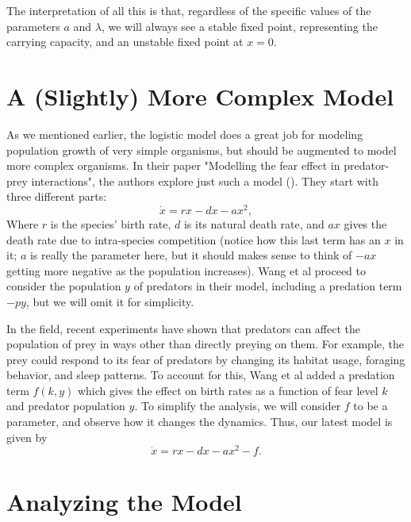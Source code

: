 \documentclass[man, 12pt]{apa6}
\newcommand{\citep}[1]{(\cite{#1})}
\begin{document}
The interpretation of all this is that, regardless of the specific values of the parameters $a$ and $\lambda$, we will always see a stable fixed point, representing the carrying capacity, and an unstable fixed point at $x=0$. 

\section{A (Slightly) More Complex Model}


As we mentioned earlier, the logistic model does a great job for modeling population growth of very simple organisms, but should be augmented to model more complex organisms. In their paper "Modelling the fear effect in predator-prey
interactions", the authors explore just such a model \citep{wang_2016}. They start with three different parts:
$$\dot{x}=rx-dx-ax^2,$$
Where $r$ is the species' birth rate, $d$ is its
natural death rate, and $ax$ gives the death rate due to intra-species competition (notice how this last term has an $x$ in it; $a$ is really the parameter here, but it should makes sense to think of $-ax$ getting more negative as the population increases). Wang et al proceed to consider the population $y$ of predators in their model, including a predation term $-py$, but we will omit it for simplicity.

In the field, recent experiments have shown that predators can affect the population of prey in ways other than directly preying on them. For example, the prey could respond to its fear of predators by changing its habitat usage, foraging behavior, and sleep patterns. %
To account for this, Wang et al added a predation term $f(k,y)$ which gives the effect on birth rates as a function of fear level $k$ and predator population $y$. To simplify the analysis, we will consider $f$ to be a parameter, and observe how it changes the dynamics. Thus, our latest model is given by 
$$\dot{x}=rx-dx-ax^2-f.$$

\section{Analyzing the Model}

\end{document}
